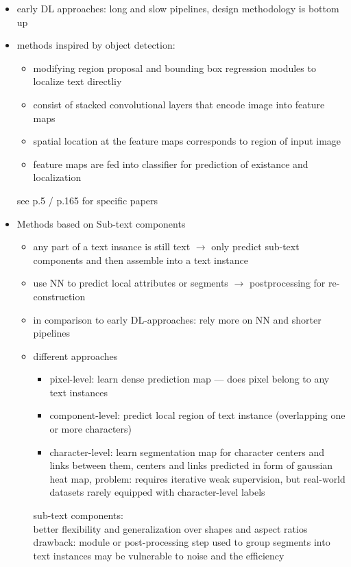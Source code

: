 \begin{itemize}
    \item early DL approaches: long and slow pipelines, design methodology is bottom up
    \item methods inspired by object detection:
        \begin{itemize}
            \item modifying region proposal and bounding box regression modules to localize text
                directliy
            \item consist of stacked convolutional layers that encode image into feature maps
            \item spatial location at the feature maps corresponds to region of input image
            \item feature maps are fed into classifier for prediction of existance and localization
        \end{itemize}
        see p.5 / p.165 for specific papers
    \item Methods based on Sub-text components
        \begin{itemize}
            \item any part of a text insance is still text
                $\rightarrow$ only predict sub-text components and then assemble into a text instance
            \item use NN to predict local attributes or segments $\rightarrow$ postprocessing for
                re-construction
            \item in comparison to early DL-approaches: rely more on NN and shorter pipelines
            \item different approaches
                \begin{itemize}
                    \item pixel-level: learn dense prediction map --- does pixel belong to
                        any text instances
                    \item component-level: predict local region of text instance (overlapping one or
                        more characters)
                    \item character-level: learn segmentation map for character centers and links
                        between them, centers and links predicted in form of gaussian heat map,
                        problem: requires iterative weak supervision, but real-world datasets rarely
                        equipped with character-level labels
                \end{itemize}
                sub-text components: \\
                better flexibility and generalization over shapes and aspect ratios\\
                drawback: module or post-processing step used to group segments into text instances
                may be vulnerable to noise and the efficiency
        \end{itemize}
\end{itemize}

